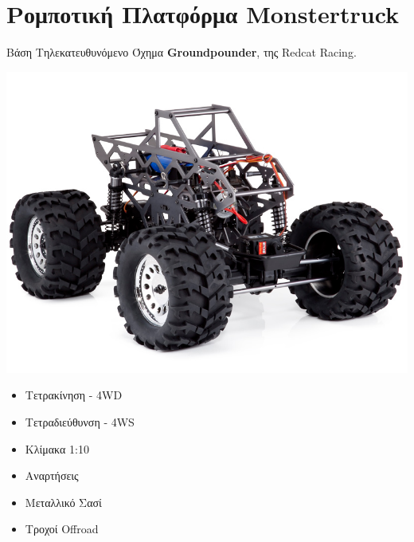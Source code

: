 \documentclass[10pt, compress]{beamer}
\begin{document}
\section{Ρομποτική Πλατφόρμα Monstertruck}

\begin{frame}{Βάση}
	Τηλεκατευθυνόμενο Όχημα \textbf{Groundpounder}, της Redcat Racing.\\[1cm]
	
	\begin{minipage}{0.55\textwidth}
		\includegraphics[width=\textwidth]{Figures/groundpounder.jpg}
	\end{minipage}
	\begin{minipage}{0.4\textwidth}
		\begin{itemize}
			\item Τετρακίνηση - 4WD
			\item Τετραδιεύθυνση - 4WS
			\item Κλίμακα 1:10
			\item Αναρτήσεις
			\item Μεταλλικό Σασί
			\item Τροχοί Offroad
		\end{itemize}
	\end{minipage}
	
\end{frame}
\end{document}
